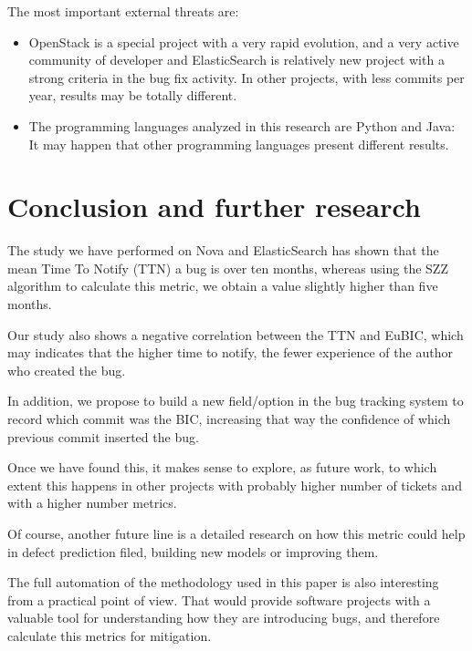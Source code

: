 \documentclass[10pt, conference]{IEEEtran}
\begin{document}
The most important external threats are:

\begin{itemize}
    \item OpenStack is a special project with a very rapid evolution, and a very active community of developer and ElasticSearch is relatively new project with a strong criteria in the bug fix activity. In other projects, with less commits per year, results may be totally different.
    \item The programming languages analyzed in this research are Python and Java: It may happen that other programming languages present different results.
\end{itemize}

\section{Conclusion and further research}
\label{sec:conclusions}

The study we have performed on Nova and ElasticSearch has shown that the mean Time To Notify (TTN) a bug is over ten months, whereas using the SZZ algorithm to calculate this metric, we obtain a value slightly higher than five months.

Our study also shows a negative correlation between the TTN and EuBIC, which may indicates that the higher time to notify, the fewer experience of the author who created the bug.

In addition, we propose to build a new field/option in the bug tracking system to record which commit was the BIC, increasing that way the confidence of which previous commit inserted the bug.

Once we have found this, it makes sense to explore, as future work, to which extent this happens in other projects with probably higher number of tickets and with a higher number metrics.

Of course, another future line is a detailed research on how this metric could help in defect prediction filed, building new models or improving them. 

The full automation of the methodology used in this paper is also interesting from a practical point of view. That would provide software projects with a valuable tool for understanding how they are introducing bugs, and therefore calculate this metrics for mitigation.


\end{document}
